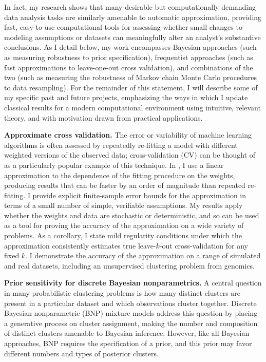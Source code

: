 In fact, my research shows that many desirable but computationally demanding
data analysis tasks are similarly amenable to automatic approximation, providing
fast, easy-to-use computational tools for assessing whether small changes to
modeling assumptions or datasets can meaningfully alter an analyst's substantive
conclusions.  As I detail below, my work encompasses Bayesian approaches (such
as measuring robustness to prior specification), frequentist approaches (such as
fast approximations to leave-one-out cross validation), and combinations of the
two (such as measuring the robustness of Markov chain Monte Carlo procedures to
data resampling). For the remainder of this statement, I will describe some of
my specific past and future projects, emphasizing the ways in which I update
classical results for a modern computational environment using intuitive,
relevant theory, and with motivation drawn from practical applications.

\textbf{Approximate cross validation.}
%
The error or variability of machine learning algorithms is often assessed by
repeatedly re-fitting a model with different weighted versions of the observed
data; cross-validation (CV) can be thought of as a particularly popular example
of this technique.
%
In \citet{giordano:2019:ij}, I use a linear approximation to the dependence of
the fitting procedure on the weights, producing results that can be faster by an
order of magnitude than repeated re-fitting. I provide explicit finite-sample
error bounds for the approximation in terms of a small number of simple,
verifiable assumptions.  My results apply whether the weights and data are
stochastic or deterministic, and so can be used as a tool for proving the
accuracy of the approximation on a wide variety of problems. As a
corollary, I state mild regularity conditions under which the approximation
consistently estimates true leave-$k$-out cross-validation for any fixed $k$. I
demonstrate the accuracy of the approximation on a range of simulated and real
datasets, including an unsupervised clustering problem from genomics.

\textbf{Prior sensitivity for discrete Bayesian nonparametrics.}
%
A central question in many probabilistic clustering problems is how many
distinct clusters are present in a particular dataset and which observations
cluster together. Discrete Bayesian nonparametric (BNP) mixture models address
this question by placing a generative process on cluster assignment, making the
number and composition of distinct clusters amenable to Bayesian inference.
However, like all Bayesian approaches, BNP requires the specification of a
prior, and this prior may favor different numbers and types of posterior
clusters.

